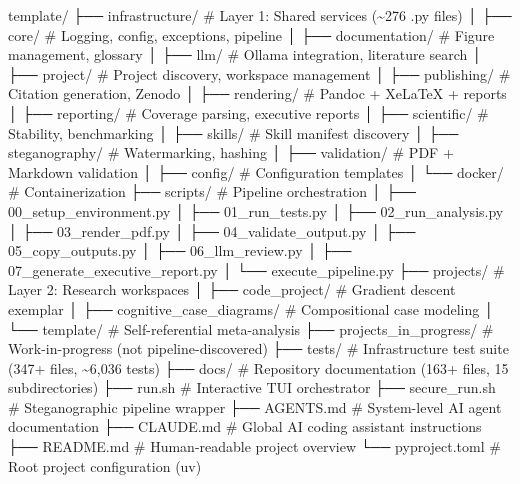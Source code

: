 \documentclass[
]{article}
\newenvironment{Shaded}{}{}
\newcommand{\NormalTok}[1]{#1}
\begin{document}
\begin{Shaded}
\begin{Highlighting}[]
\NormalTok{template/}
\NormalTok{├── infrastructure/           \# Layer 1: Shared services (\textasciitilde{}276 .py files)}
\NormalTok{│   ├── core/                 \# Logging, config, exceptions, pipeline}
\NormalTok{│   ├── documentation/        \# Figure management, glossary}
\NormalTok{│   ├── llm/                  \# Ollama integration, literature search}
\NormalTok{│   ├── project/              \# Project discovery, workspace management}
\NormalTok{│   ├── publishing/           \# Citation generation, Zenodo}
\NormalTok{│   ├── rendering/            \# Pandoc + XeLaTeX + reports}
\NormalTok{│   ├── reporting/            \# Coverage parsing, executive reports}
\NormalTok{│   ├── scientific/           \# Stability, benchmarking}
\NormalTok{│   ├── skills/               \# Skill manifest discovery}
\NormalTok{│   ├── steganography/        \# Watermarking, hashing}
\NormalTok{│   ├── validation/           \# PDF + Markdown validation}
\NormalTok{│   ├── config/               \# Configuration templates}
\NormalTok{│   └── docker/               \# Containerization}
\NormalTok{├── scripts/                  \# Pipeline orchestration}
\NormalTok{│   ├── 00\_setup\_environment.py}
\NormalTok{│   ├── 01\_run\_tests.py}
\NormalTok{│   ├── 02\_run\_analysis.py}
\NormalTok{│   ├── 03\_render\_pdf.py}
\NormalTok{│   ├── 04\_validate\_output.py}
\NormalTok{│   ├── 05\_copy\_outputs.py}
\NormalTok{│   ├── 06\_llm\_review.py}
\NormalTok{│   ├── 07\_generate\_executive\_report.py}
\NormalTok{│   └── execute\_pipeline.py}
\NormalTok{├── projects/                 \# Layer 2: Research workspaces}
\NormalTok{│   ├── code\_project/         \# Gradient descent exemplar}
\NormalTok{│   ├── cognitive\_case\_diagrams/ \# Compositional case modeling}
\NormalTok{│   └── template/             \# Self{-}referential meta{-}analysis}
\NormalTok{├── projects\_in\_progress/     \# Work{-}in{-}progress (not pipeline{-}discovered)}
\NormalTok{├── tests/                    \# Infrastructure test suite (347+ files, \textasciitilde{}6,036 tests)}
\NormalTok{├── docs/                     \# Repository documentation (163+ files, 15 subdirectories)}
\NormalTok{├── run.sh                    \# Interactive TUI orchestrator}
\NormalTok{├── secure\_run.sh             \# Steganographic pipeline wrapper}
\NormalTok{├── AGENTS.md                 \# System{-}level AI agent documentation}
\NormalTok{├── CLAUDE.md                 \# Global AI coding assistant instructions}
\NormalTok{├── README.md                 \# Human{-}readable project overview}
\NormalTok{└── pyproject.toml            \# Root project configuration (uv)}
\end{Highlighting}
\end{Shaded}
\end{document}
